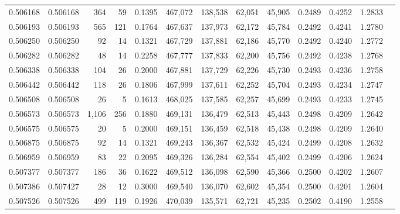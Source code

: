 \begin{tabular}{rrrrrrrrrrrrr}
0.506168 & 0.506168 &   364 &    59 &                                     0.1395 & 467,072 & 138,538 &  62,051 &  45,905 & 0.2489 & 0.4252 & 1.2833 \\
0.506193 & 0.506193 &   565 &   121 &                                     0.1764 & 467,637 & 137,973 &  62,172 &  45,784 & 0.2492 & 0.4241 & 1.2780 \\
0.506250 & 0.506250 &    92 &    14 &                                     0.1321 & 467,729 & 137,881 &  62,186 &  45,770 & 0.2492 & 0.4240 & 1.2772 \\
0.506282 & 0.506282 &    48 &    14 &                                     0.2258 & 467,777 & 137,833 &  62,200 &  45,756 & 0.2492 & 0.4238 & 1.2768 \\
0.506338 & 0.506338 &   104 &    26 &                                     0.2000 & 467,881 & 137,729 &  62,226 &  45,730 & 0.2493 & 0.4236 & 1.2758 \\
0.506442 & 0.506442 &   118 &    26 &                                     0.1806 & 467,999 & 137,611 &  62,252 &  45,704 & 0.2493 & 0.4234 & 1.2747 \\
0.506508 & 0.506508 &    26 &     5 &                                     0.1613 & 468,025 & 137,585 &  62,257 &  45,699 & 0.2493 & 0.4233 & 1.2745 \\
0.506573 & 0.506573 & 1,106 &   256 &                                     0.1880 & 469,131 & 136,479 &  62,513 &  45,443 & 0.2498 & 0.4209 & 1.2642 \\
0.506575 & 0.506575 &    20 &     5 &                                     0.2000 & 469,151 & 136,459 &  62,518 &  45,438 & 0.2498 & 0.4209 & 1.2640 \\
0.506875 & 0.506875 &    92 &    14 &                                     0.1321 & 469,243 & 136,367 &  62,532 &  45,424 & 0.2499 & 0.4208 & 1.2632 \\
0.506959 & 0.506959 &    83 &    22 &                                     0.2095 & 469,326 & 136,284 &  62,554 &  45,402 & 0.2499 & 0.4206 & 1.2624 \\
0.507377 & 0.507377 &   186 &    36 &                                     0.1622 & 469,512 & 136,098 &  62,590 &  45,366 & 0.2500 & 0.4202 & 1.2607 \\
0.507386 & 0.507427 &    28 &    12 &                                     0.3000 & 469,540 & 136,070 &  62,602 &  45,354 & 0.2500 & 0.4201 & 1.2604 \\
0.507526 & 0.507526 &   499 &   119 &                                     0.1926 & 470,039 & 135,571 &  62,721 &  45,235 & 0.2502 & 0.4190 & 1.2558 \\

\end{tabular}
